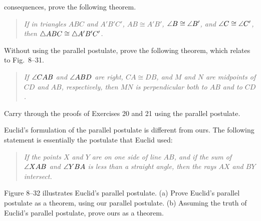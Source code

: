 \documentclass[11pt]{book}
\begin{document}
\begin{exlist}
  consequences, prove the following theorem.
  \begin{quote}
  \emph{If in triangles $ABC$ and $A'B'C'$, $AB \cong A'B'$,
  $\angle B \cong \angle B'$, and $\angle C \cong \angle C'$, then
  $\triangle ABC \cong \triangle A'B'C'$.}
  \end{quote}
\item[\stex 21.] Without using the parallel postulate, prove the following
  theorem, which relates to Fig.~8--31.
  \begin{quote}
  \emph{If $\angle CAB$ and $\angle ABD$ are right, $CA \cong DB$, and $M$ and
  $N$ are midpoints of $CD$ and $AB$, respectively, then $MN$ is perpendicular
  both to $AB$ and to $CD$.}
  \end{quote}
\exfig{\FIGVIIITHIRTYONE}
\end{exlist}

\begin{exlist}
\item[\stex 22.] Carry through the proofs of Exercises 20 and 21 using the
  parallel postulate.
\item[\stex 23.] Euclid's formulation of the parallel postulate is different
  from ours. The following statement is essentially the postulate that Euclid
  used:
  \begin{quote}
  \emph{If the points $X$ and $Y$ are on one side of line $AB$, and if the sum
  of $\angle XAB$ and $\angle YBA$ is less than a straight angle, then the rays
  $AX$ and $BY$ intersect.}
  \end{quote}
  Figure 8--32 illustrates Euclid's parallel postulate. (a) Prove Euclid's
  parallel postulate as a theorem, using our parallel postulate. (b) Assuming
  the truth of Euclid's parallel postulate, prove ours as a theorem.
\exfig{\FIGVIIITHIRTYTWO}
\end{exlist}
\end{document}
